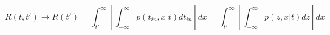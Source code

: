 \begin{equation}
R(t,t') \to R(t')= \int_{t'}^\infty \left[ \int_{-\infty}^\infty p(t_{in},x|t) dt_{in} \right]  dx = \int_{t'}^\infty \left[ \int_{-\infty}^\infty p(z,x|t) dz \right] dx
\end{equation}